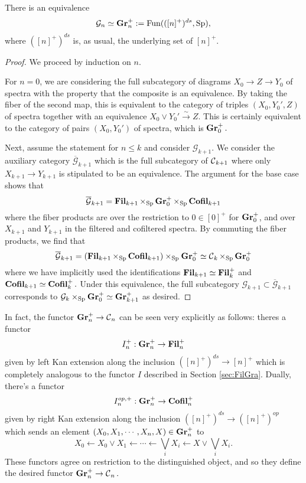 \begin{lem}
There is an equivalence $$\mathcal{G}_n \simeq \operatorname{\textbf{Gr}}_n^+ := \operatorname{\text{Fun}}(([n]^{+})^{ds}, \operatorname{\text{Sp}}),$$
where $([n]^+)^{ds}$ is, as usual, the underlying set of $[n]^+$.  
\end{lem}
\begin{proof}
We proceed by induction on $n$.  

For $n=0$, we are considering the full subcategory of diagrams $X_0 \to Z \to Y_0$ of spectra with the property that the composite is an equivalence.  By taking the fiber of the second map, this is equivalent to the category of triples $(X_0, Y_0',Z)$ of spectra together with an equivalence $X_0 \vee Y_0' \xrightarrow{\sim} Z.$   This is  certainly equivalent to the category of pairs $(X_0, Y_0')$ of spectra, which is $\operatorname{\textbf{Gr}}_0^+.$  

Next, assume the statement for $n\leq k$ and consider $\mathcal{G}_{k+1}.$  We consider the auxiliary category $\overline{\mathcal{G}}_{k+1}$ which is the full subcategory of $\operatorname{\mathcal{C}}_{k+1}$ where only $X_{k+1} \to Y_{k+1}$ is stipulated to be an equivalence.    The argument for the base case shows that $$\overline{\mathcal{G}}_{k+1} = \operatorname{\textbf{Fil}}_{k+1} \times_{\operatorname{\text{Sp}}} \operatorname{\textbf{Gr}}_0^+ \times_{\operatorname{\text{Sp}}} \operatorname{\textbf{Cofil}}_{k+1}$$ where the fiber products are over the restriction to $0\in [0]^+$ for $\operatorname{\textbf{Gr}}_0^+$, and over $X_{k+1}$ and $Y_{k+1}$ in the filtered and cofiltered spectra.  By commuting the fiber products, we find that $$\overline{\mathcal{G}}_{k+1} = (\operatorname{\textbf{Fil}}_{k+1} \times_{\operatorname{\text{Sp}}} \operatorname{\textbf{Cofil}}_{k+1}) \times_{\operatorname{\text{Sp}}} \operatorname{\textbf{Gr}}_0^+  \simeq \operatorname{\mathcal{C}}_k \times_{\operatorname{\text{Sp}}} \operatorname{\textbf{Gr}}_0^+$$ where we have implicitly used the identifications $\operatorname{\textbf{Fil}}_{k+1} \simeq \operatorname{\textbf{Fil}}_k^+$ and $\operatorname{\textbf{Cofil}}_{k+1} \simeq \operatorname{\textbf{Cofil}}_k^+.$   Under this equivalence, the full subcategory $\mathcal{G}_{k+1} \subset \overline{\mathcal{G}}_{k+1}$ corresponds to $\mathcal{G}_k \times_{\operatorname{\text{Sp}}} \operatorname{\textbf{Gr}}_0^+ \simeq \operatorname{\textbf{Gr}}_{k+1}^+$ as desired.  

\end{proof}



In fact, the functor $\operatorname{\textbf{Gr}}_n^+ \to \operatorname{\mathcal{C}}_n$ can be seen very explicitly as follows: theres a functor $$I_n^+: \operatorname{\textbf{Gr}}_n^+ \to \operatorname{\textbf{Fil}}_n^+$$ given by left Kan extension along the inclusion $([n]^+)^{ds} \to [n]^+$ which is completely analogous to the functor $I$ described in Section \ref{sec:FilGra}.  Dually, there's a functor $$I_n^{op,+}:\operatorname{\textbf{Gr}}_n^+ \to \operatorname{\textbf{Cofil}}_n^+$$ given by right Kan extension along the inclusion $([n]^+)^{ds} \to ([n]^+)^{op}$ which sends an element $(X_0, X_1, \cdots, X_n, X)\in \operatorname{\textbf{Gr}}_n^+$ to $$X_0 \longleftarrow X_0\vee X_1 \longleftarrow \cdots \longleftarrow \bigvee_i X_i \longleftarrow X \vee \bigvee_i X_i.$$  These functors agree on restriction to the distinguished object, and so they define the desired functor $\operatorname{\textbf{Gr}}_n^+ \to \operatorname{\mathcal{C}}_n.$  



